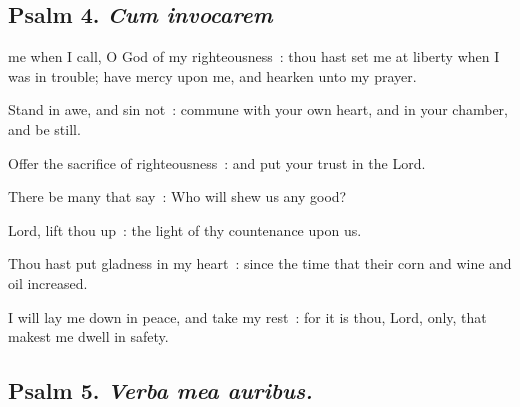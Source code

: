 \subsection{Psalm 4. \textit{Cum invocarem}}

 me when I call, O God of my righteousness~: thou hast set me at liberty when I was in trouble; have mercy upon me, and hearken unto my prayer.\par
{}
Stand in awe, and sin not~: commune with your own heart, and in your chamber, and be still.\par
{}Offer the sacrifice of righteousness~: and put your trust in the Lord.\par
{}There be many that say~: Who will shew us any good?\par
{}Lord, lift thou up~: the light of thy countenance upon us.\par
{}Thou hast put gladness in my heart~: since the time that their corn and wine and oil increased.\par
{}I will lay me down in peace, and take my rest~: for it is thou, Lord, only, that makest me dwell in safety.\par

\clearpage
\subsection{Psalm 5. \textit{Verba mea auribus.}}

